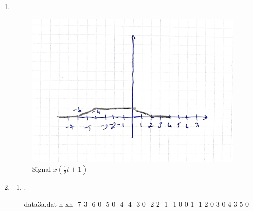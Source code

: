 \documentclass[10pt,a4paper, margin=1in]{article}
\begin{document}
\begin{enumerate}
    \item ~\\
          \begin{figure}[H]
              \centering
              \includegraphics[scale=0.1]{hw1_q2.jpeg}
              \caption{Signal $x(\frac{1}{2}t+1)$}
          \end{figure}

    \item %
          \begin{enumerate}
              \item %
                .\\
              \begin{filecontents}{data3a.dat}
                 n   xn
                 -7   3
                 -6   0
                 -5   0
                 -4   -4
                 -3   0
                 -2   2
                 -1   -1
                 0    0
                 1    -1
                 2    0
                 3    0 
                 4    3  
                 5    0  
                \end{filecontents}


\end{enumerate}
\end{enumerate}
\end{document}
